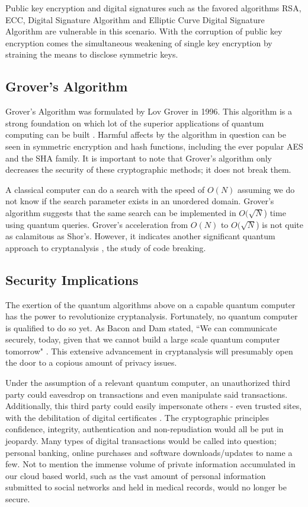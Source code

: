 Public key encryption and digital signatures such as the favored algorithms RSA, ECC, Digital Signature Algorithm and Elliptic Curve Digital Signature Algorithm are vulnerable in this scenario. With the corruption of public key encryption comes the simultaneous weakening of single key encryption by straining the means to disclose symmetric keys.

\subsection{Grover's Algorithm}
Grover's Algorithm was formulated by Lov Grover in 1996. This algorithm is a strong foundation on which lot of the superior applications of quantum computing can be built \cite{Post_Q_Cryptog}. Harmful affects by the algorithm in question can be seen in symmetric encryption and hash functions, including the ever popular AES and the SHA family. It is important to note that Grover's algorithm only decreases the security of these cryptographic methods; it does not break them.

A classical computer can do a search with the speed of \(O(N)\) assuming we do not know if the search parameter exists in an unordered domain. Grover's algorithm suggests that the same search can be implemented in \(O(\sqrt{N}\)) time using quantum queries. Grover's acceleration from \(O(N)\) to \(O(\sqrt{N}\)) is not quite as calamitous as Shor's. However, it indicates another significant quantum approach to cryptanalysis \cite{Quantum_Cryptanal}, the study of code breaking. 

\subsection{Security Implications}
The exertion of the quantum algorithms above on a capable quantum computer has the power to revolutionize cryptanalysis. Fortunately, no quantum computer is qualified to do so yet. As Bacon and Dam stated, ``We can communicate securely, today, given that we cannot build a large scale quantum computer tomorrow" \cite{Q_Alg}. This extensive advancement in cryptanalysis will presumably open the door to a copious amount of privacy issues. 

Under the assumption of a relevant quantum computer, an unauthorized third party could eavesdrop on transactions and even manipulate said transactions. Additionally, this third party could easily impersonate others - even trusted sites, with the debilitation of digital certificates \cite{Sec_Risk}. The cryptographic principles confidence, integrity, authentication and non-repudiation would all be put in jeopardy. Many types of digital transactions would be called into question; personal banking, online purchases and software downloads/updates to name a few. Not to mention the immense volume of private information accumulated in our cloud based world, such as the vast amount of personal information submitted to social networks and held in medical records, would no longer be secure. 

